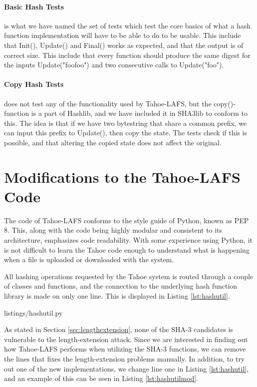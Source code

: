 \documentclass[english,12pt,a4paper]{book}
\begin{document}
\paragraph{Basic Hash Tests} is what we have named the set of tests which test
the core basics of what a hash function implementation will have to be able to
do to be usable. This include that Init(), Update() and Final() works as
expected, and that the output is of correct size. This include that every
function should produce the same digest for the inputs Update("foofoo") and two
consecutive calls to Update("foo").

\paragraph{Copy Hash Tests} does not test any of the functionality used by
Tahoe-\ac{LAFS}, but the copy()-function is a part of Hashlib, and we have
included it in SHA3lib to conform to this. The idea is that if we have two
bytestring that share a common prefix, we can input this prefix to Update(),
then copy the state. The tests check if this is possible, and that altering the
copied state does not affect the original.


\section{Modifications to the Tahoe-\ac{LAFS} Code}
\label{sec:modtahoe}

The code of Tahoe-LAFS conforms to the style guide of Python, known as PEP 8.
This, along with the code being highly modular and consistent to its
architecture, emphasizes code readability.
With some experience using Python, it is not difficult to learn the Tahoe code
enough to understand what is happening when a file is uploaded or downloaded
with the system.

All hashing operations requested by the Tahoe system is routed through a
couple of classes and functions, and the connection to the underlying hash
function library is made on only one line. This is displayed in Listing
\ref{lst:hashutil}.


{listings/hashutil.py}

As stated in Section \ref{sec:lengthextension}, none of the SHA-3 candidates is
vulnerable to the length-extension attack. Since we are interested in finding
out how Tahoe-\ac{LAFS} performs when utilizing the SHA-3 functions, we can
remove the lines that fixes the length-extension problems manually. In addition,
to try out one of the new implementations, we change line one in Listing
\ref{lst:hashutil}, and an example of this can be seen in Listing
\ref{lst:hashutilmod}.
\end{document}
